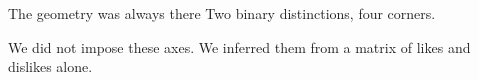 \begin{frame}{The geometry was always there}
  Two binary distinctions, four corners.

  \vspace{0.8em}

  We did not impose these axes.  We inferred them from a matrix of
  likes and dislikes alone.
\end{frame}


